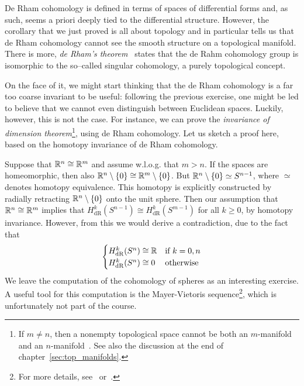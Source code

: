 \begin{remark}\label{rmk:ch_topology_domain_invariance}
	De Rham cohomology is defined in terms of spaces of differential forms and, as such, seems a priori deeply tied to the differential structure. However, the corollary that we just proved is all about topology and in particular tells us that de Rham cohomology cannot see the smooth structure on a topological manifold.
	There is more, \emph{de Rham's theorem}~\cite[Theorem 18.14]{book:lee} states that the de Rahm cohomology group is isomorphic to the so--called singular cohomology, a purely topological concept.

	On the face of it, we might start thinking that the de Rham cohomology is a far too coarse invariant to be useful: following the previous exercise, one might be led to believe that we cannot even distinguish between Euclidean spaces. Luckily, however, this is not the case.
	For instance, we can prove the \emph{invariance of dimension theorem}\footnote{If $m\neq n$, then a nonempty topological space cannot be both an $m$-manifold and an $n$-manifold~\cite[Problem 13-3]{book:lee:topology}. See also the discussion at the end of chapter~\ref{sec:top_manifolds}.}, using de Rham cohomology. Let us sketch a proof here, based on the homotopy invariance of de Rham cohomology.

	Suppose that $\mathbb{R}^n\cong\mathbb{R}^m$ and assume w.l.o.g. that $m>n$. If the spaces are homeomorphic, then also $\mathbb{R}^n\setminus\{0\}\cong\mathbb{R}^m\setminus\{0\}$. But $\mathbb{R}^n\setminus\{0\}\simeq S^{n-1}$, where $\simeq$ denotes homotopy equivalence. This homotopy is explicitly constructed by radially retracting $\mathbb{R}^n\setminus\{0\}$ onto the unit sphere. Then our assumption that $\mathbb{R}^n\cong\mathbb{R}^m$ implies that $H^k_{\mathrm{dR}}(S^{n-1})\cong H^k_{\mathrm{dR}}(S^{m-1})$ for all $k\geq 0$,
	by homotopy invariance. However, from this we would derive a contradiction, due to the fact that
	\begin{equation}
		\begin{cases}
			H_{\mathrm{dR}}^k(S^n)\cong\mathbb{R} & \mbox{if }k=0,n  \\
			H_{\mathrm{dR}}^k(S^n)\cong 0 & \mbox{otherwise}
		\end{cases}
	\end{equation}
	We leave the computation of the cohomology of spheres as an interesting exercise.
	A useful tool for this computation is the Mayer-Vietoris sequence\footnote{For more details, see~\cite[Chapter 17.3]{book:lee} or~\cite[Chapter 26]{book:tu}.}, which is unfortunately not part of the course.
\end{remark}


